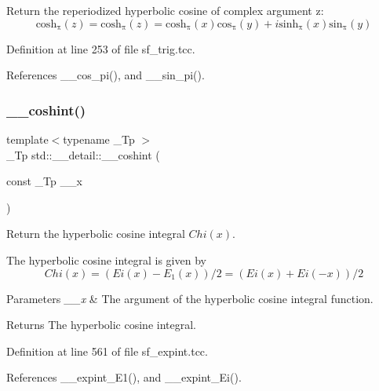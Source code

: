 Return the reperiodized hyperbolic cosine of complex argument z\+: \[ \mathrm{cosh_\pi}(z) = \mathrm{cosh_\pi}(z) = \mathrm{cosh_\pi}(x) \mathrm{cos_\pi}(y) + i \mathrm{sinh_\pi}(x) \mathrm{sin_\pi}(y) \] 

Definition at line 253 of file sf\+\_\+trig.\+tcc.



References \+\_\+\+\_\+cos\+\_\+pi(), and \+\_\+\+\_\+sin\+\_\+pi().

\mbox{\label{namespacestd_1_1____detail_ad48a89a591f7b58a047f072e6e383663}} 
\subsubsection{\texorpdfstring{\+\_\+\+\_\+coshint()}{\_\_coshint()}}
{\footnotesize\ttfamily template$<$typename \+\_\+\+Tp $>$ \\
\+\_\+\+Tp std\+::\+\_\+\+\_\+detail\+::\+\_\+\+\_\+coshint (\begin{DoxyParamCaption}\item[{const \+\_\+\+Tp}]{\+\_\+\+\_\+x }\end{DoxyParamCaption})}



Return the hyperbolic cosine integral $ Chi(x) $. 

The hyperbolic cosine integral is given by \[ Chi(x) = (Ei(x) - E_1(x))/ 2 = (Ei(x) + Ei(-x))/2 \]


\begin{DoxyParams}{Parameters}
{\em \+\_\+\+\_\+x} & The argument of the hyperbolic cosine integral function. \\
\hline
\end{DoxyParams}
\begin{DoxyReturn}{Returns}
The hyperbolic cosine integral. 
\end{DoxyReturn}


Definition at line 561 of file sf\+\_\+expint.\+tcc.



References \+\_\+\+\_\+expint\+\_\+\+E1(), and \+\_\+\+\_\+expint\+\_\+\+Ei().

\mbox{\label{namespacestd_1_1____detail_a0737f268d024ed5d66d3e926239a5c49}} 
